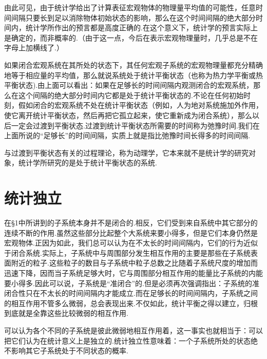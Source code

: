 由此可见，由于统计学给出了计算表征宏观物体的物理量平均值的可能性，任意时间间隔只要长到足以消除物体初始状态的影响，那么在这个时间间隔的绝大部分时间内，统计学所作出的预言都是高度正确的.在这个意义下，统计学的预言实际上是确定的，而非概率的.（由于这一点，今后在表示宏观物理量时，几乎总是不在字母上加横线了.）

如果闭合宏观系统在其所处的状态下，其任何宏观子系统的宏观物理量都充分精确地等于相应量的平均值，那么就说系统处于统计平衡状态（也称为热力学平衡或热平衡状态).由上面可以看出：如果在足够长的时间间隔内观测闭合的宏观系统，那么在这个间隔的绝大部分时间内它都是处于统计平衡状态的.不论在任何初始时刻，假如闭合的宏观系统不处在统计平衡状态（例如，人为地对系统施加外作用，使它离开统计平衡状态，然后再把它孤立起来，使它重新成为闭合系统），那么以后一定会过渡到平衡状态.过渡到统计平衡状态所需要的时间称为弛豫时间.我们在上面所说的“足够长”的时间间隔，实质上就是指比弛豫时间长得多的时间间隔.

与过渡到平衡状态有关的过程理论，称为动理学，它本来就不是统计学的研究对象，统计学所研究的是处于统计平衡状态的系统.

\section{统计独立}

在§1中所讲到的子系统本身并不是闭合的.相反，它们受到来自系统中其它部分的连续不断的作用.虽然这些部分比起整个大系统来要小得多，但是它们本身仍然是宏观物体.正因为如此，我们总可以认为在不太长的时间间隔内，它们的行为近似于闭合系统.实际上，子系统中与周围部分发生相互作用的主要是那些在子系统表面附近的粒子.这些粒子的数目与子系统中粒子总数之比随着子系统尺度的增加而迅速下降，因而当子系统足够大时，它与周围部分相互作用的能量比子系统的内能要小得多.因此可以说，子系统是“准闭合”的.但是必须再次强调指出：子系统的准闭合性只在不太长的时间间隔内才能成立.而在足够长的时间间隔内，子系统之间的相互作用不管多么微弱，总会表现出来.不仅如此，统计平衡之得以建立，归根到底就是全靠这些比较微弱的相互作用.

可以认为各个不同的子系统是彼此微弱地相互作用着，这一事实也就相当于：可以把它们认为在统计意义上是独立的.统计独立性意味着：一个子系统所处的状态绝不影响其它子系统处于不同状态的概率.

